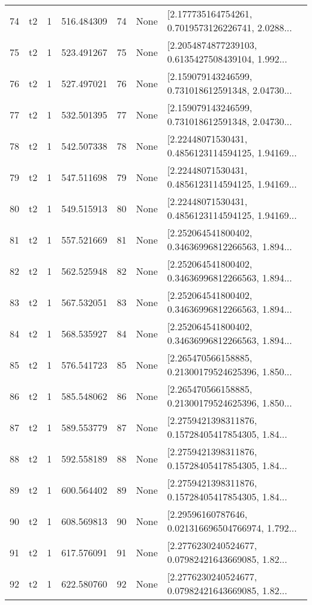 \begin{tabular}{lllrlll}
74  &  t2 &   1 &   516.484309 &   74 &  None &  [2.177735164754261, 0.7019573126226741, 2.0288... \\
75  &  t2 &   1 &   523.491267 &   75 &  None &  [2.2054874877239103, 0.6135427508439104, 1.992... \\
76  &  t2 &   1 &   527.497021 &   76 &  None &  [2.159079143246599, 0.731018612591348, 2.04730... \\
77  &  t2 &   1 &   532.501395 &   77 &  None &  [2.159079143246599, 0.731018612591348, 2.04730... \\
78  &  t2 &   1 &   542.507338 &   78 &  None &  [2.22448071530431, 0.4856123114594125, 1.94169... \\
79  &  t2 &   1 &   547.511698 &   79 &  None &  [2.22448071530431, 0.4856123114594125, 1.94169... \\
80  &  t2 &   1 &   549.515913 &   80 &  None &  [2.22448071530431, 0.4856123114594125, 1.94169... \\
81  &  t2 &   1 &   557.521669 &   81 &  None &  [2.252064541800402, 0.34636996812266563, 1.894... \\
82  &  t2 &   1 &   562.525948 &   82 &  None &  [2.252064541800402, 0.34636996812266563, 1.894... \\
83  &  t2 &   1 &   567.532051 &   83 &  None &  [2.252064541800402, 0.34636996812266563, 1.894... \\
84  &  t2 &   1 &   568.535927 &   84 &  None &  [2.252064541800402, 0.34636996812266563, 1.894... \\
85  &  t2 &   1 &   576.541723 &   85 &  None &  [2.265470566158885, 0.21300179524625396, 1.850... \\
86  &  t2 &   1 &   585.548062 &   86 &  None &  [2.265470566158885, 0.21300179524625396, 1.850... \\
87  &  t2 &   1 &   589.553779 &   87 &  None &  [2.2759421398311876, 0.15728405417854305, 1.84... \\
88  &  t2 &   1 &   592.558189 &   88 &  None &  [2.2759421398311876, 0.15728405417854305, 1.84... \\
89  &  t2 &   1 &   600.564402 &   89 &  None &  [2.2759421398311876, 0.15728405417854305, 1.84... \\
90  &  t2 &   1 &   608.569813 &   90 &  None &  [2.29596160787646, 0.021316696504766974, 1.792... \\
91  &  t2 &   1 &   617.576091 &   91 &  None &  [2.2776230240524677, 0.07982421643669085, 1.82... \\
92  &  t2 &   1 &   622.580760 &   92 &  None &  [2.2776230240524677, 0.07982421643669085, 1.82... \\

\end{tabular}
